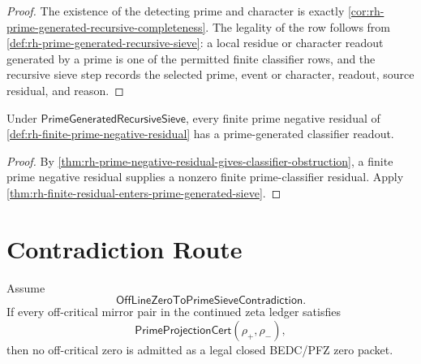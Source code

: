 \begin{proof}
The existence of the detecting prime and character is exactly
\autoref{cor:rh-prime-generated-recursive-completeness}.  The
legality of the row follows from
\autoref{def:rh-prime-generated-recursive-sieve}: a local residue or
character readout generated by a prime is one of the permitted finite
classifier rows, and the recursive sieve step records the selected
prime, event or character, readout, source residual, and reason.
\end{proof}

\begin{corollary}
\label{cor:rh-signed-residuals-enter-recursive-sieve}
Under $\mathsf{PrimeGeneratedRecursiveSieve}$, every finite prime
negative residual of
\autoref{def:rh-finite-prime-negative-residual} has a prime-generated
classifier readout.
\end{corollary}

\begin{proof}
By
\autoref{thm:rh-prime-negative-residual-gives-classifier-obstruction},
a finite prime negative residual supplies a nonzero finite
prime-classifier residual.  Apply
\autoref{thm:rh-finite-residual-enters-prime-generated-sieve}.
\end{proof}

\section{Contradiction Route}
\label{sec:rh-offline-zero-prime-sieve-contradiction-route}

\begin{theorem}
\label{thm:rh-offline-zero-to-prime-sieve-contradiction}
Assume
$$
\mathsf{OffLineZeroToPrimeSieveContradiction}.
$$
If every off-critical mirror pair in the continued zeta ledger satisfies
$$
\mathsf{PrimeProjectionCert}(\rho_+,\rho_-),
$$
then no off-critical zero is admitted as a legal closed BEDC/PFZ zero
packet.
\end{theorem}

